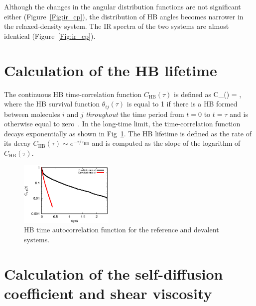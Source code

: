 \documentclass[aps,prl,reprint,amsmath,amssymb]{revtex4-1}
\begin{document}
Although the changes in the angular distribution functions are not significant either (Figure~\ref{Fig:ir_cp}), the distribution of HB angles becomes narrower in the relaxed-density system. The IR spectra of the two systems are almost identical (Figure~\ref{Fig:ir_cp}).

%

\section{Calculation of the HB lifetime} 

The continuous HB time-correlation function $C_{\text{HB}}(\tau)$ is defined as 
%
\bea
C_{}(\tau) =  \label{Eq:HBdecay},
\eea
%
where the HB survival function $\theta_{ij}(\tau)$ is equal to 1 if there is a HB formed between molecules $i$ and $j$ \emph{throughout} the time period from $t=0$ to $t=\tau$ and is otherwise equal to zero~\cite{rapaport1983hydrogen,starr1999fast}. 
In the long-time limit, the time-correlation function decays exponentially as shown in Fig~\ref{Fig:HBdecay}. 
The HB lifetime is defined as the rate of its decay $C_{\text{HB}}(\tau) \sim e^{-\tau/\tau_{\text{HB}}}$ and is computed as the slope of the logarithm of $C_{\text{HB}}(\tau)$.


\begin{figure}
\includegraphics[width=0.4\textwidth]{new_hbdecay}
\caption{HB time autocorrelation function for the reference and devalent systems.} \label{Fig:HBdecay}
\end{figure}

\section{Calculation of the self-diffusion coefficient and shear viscosity} 
\end{document}

